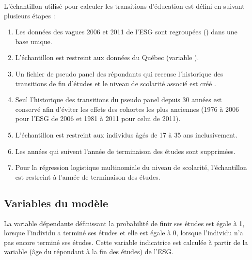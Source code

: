 \documentclass[letterpaper,10pt,french]{sphinxmanual}
\begin{document}
L’échantillon utilisé pour calculer les transitions d’éducation est défini en suivant plusieurs étapes :
\begin{enumerate}
%
\item {} 
Les données des vagues 2006 et 2011 de l’ESG sont regroupées () dans une base unique.

\item {} 
L’échantillon est restreint aux données du Québec (variable ).

\item {} 
Un fichier de pseudo panel des répondants qui recense l’historique des transitions de fin d’études et le niveau de scolarité associé est créé .

\item {} 
Seul l’historique des transitions du pseudo panel depuis 30 années est conservé afin d’éviter les effets des cohortes les plus anciennes  (1976 à 2006 pour l’ESG de 2006 et 1981 à 2011 pour celui de 2011).

\item {} 
L’échantillon est restreint aux individus âgés de 17 à 35 ans inclusivement.

\item {} 
Les années qui suivent l’année de terminaison des études sont supprimées.

\item {} 
Pour la régression logistique multinomiale du niveau de scolarité, l’échantillon est restreint à l’année de terminaison des études.

\end{enumerate}


\subsection{Variables du modèle}
\label{\detokenize{methodologie:id4}}
La variable dépendante  définissant la probabilité de finir ses études est égale à 1,
lorsque l’individu a terminé ses études et elle est égale à 0,
lorsque l’individu n’a pas encore terminé ses études.
Cette variable indicatrice est calculée à partir de la variable  (âge du répondant à la fin des études) de l’ESG.
\end{document}
